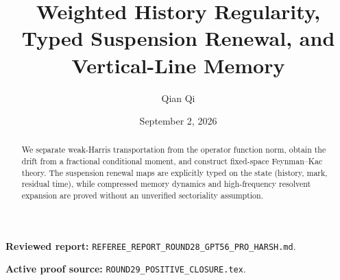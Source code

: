 \documentclass[11pt,reqno]{amsart}
\title[A4 Round 29 revision]{Weighted History Regularity, Typed Suspension Renewal, and Vertical-Line Memory}
\author{Qian Qi}
\date{September 2, 2026}
\begin{document}
\begin{abstract}We separate weak-Harris transportation from the operator function norm, obtain the drift from a fractional conditional moment, and construct fixed-space Feynman--Kac theory. The suspension renewal maps are explicitly typed on the state (history, mark, residual time), while compressed memory dynamics and high-frequency resolvent expansion are proved without an unverified sectoriality assumption.\end{abstract}
\maketitle
\noindent\textbf{Reviewed report:} \texttt{REFEREE\_REPORT\_ROUND28\_GPT56\_PRO\_HARSH.md}.\par
\noindent\textbf{Active proof source:} \texttt{ROUND29\_POSITIVE\_CLOSURE.tex}.\par

\end{document}
